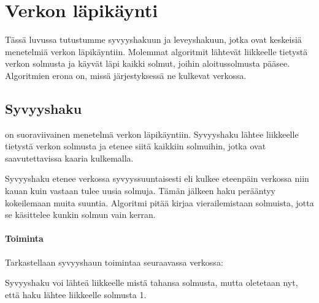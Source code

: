 \chapter{Verkon läpikäynti}

Tässä luvussa tutustumme
syvyyshakuun ja leveyshakuun, jotka
ovat keskeisiä menetelmiä verkon läpikäyntiin.
Molemmat algoritmit lähtevät liikkeelle
tietystä verkon solmusta ja 
käyvät läpi kaikki solmut,
joihin aloitussolmusta pääsee.
Algoritmien erona on,
missä järjestyksessä ne kulkevat verkossa.

\section{Syvyyshaku}


on suoraviivainen menetelmä verkon läpikäyntiin.
Syvyyshaku lähtee liikkeelle tietystä
verkon solmusta ja etenee siitä
kaikkiin solmuihin, jotka ovat
saavutettavissa kaaria kulkemalla.

Syvyyshaku etenee verkossa syvyyssuuntaisesti
eli kulkee eteenpäin verkossa niin kauan
kuin vastaan tulee uusia solmuja.
Tämän jälkeen haku perääntyy kokeilemaan
muita suuntia.
Algoritmi pitää kirjaa vierailemistaan solmuista,
jotta se käsittelee kunkin solmun vain kerran.

\subsubsection*{Toiminta}

Tarkastellaan syvyyshaun toimintaa
seuraavassa verkossa:
\begin{center}
\end{center}
Syvyyshaku voi lähteä liikkeelle
mistä tahansa solmusta,
mutta oletetaan nyt,
että haku lähtee liikkeelle solmusta 1.

